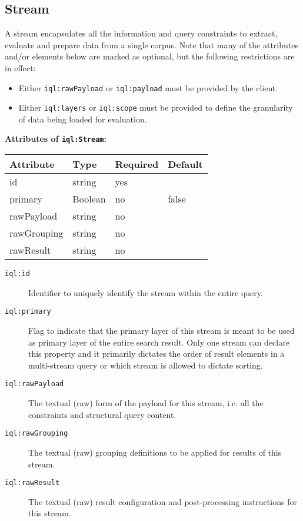 \documentclass[11pt]{article}
\newcommand{\compresslist}{ %
	\setlength{\topsep}{0pt}
	\setlength{\itemsep}{1pt}
	\setlength{\parskip}{0pt}
	\setlength{\parsep}{0pt}
}
\newcommand{\iqlns}{iql:}
\newcommand{\iqlType}[1]{\texttt{\iqlns#1}}
\newcommand{\desc}[1]{\noindent#1\newline\medskip}
\newenvironment{attributes}[1]{
\noindent\textbf{Attributes of #1:}\newline\medskip
\begin{tabular}{|p{0.3\textwidth}|p{0.20\textwidth}|p{0.20\textwidth}|p{0.17\textwidth}|}
	\hline
	\textbf{Attribute} & \textbf{Type} & \textbf{Required} & \textbf{Default} \\ 
	\hline
	\hline
}{
\end{tabular}
}
\newcommand{\attribute}[4]{
	#1 & #2 & #3 & #4 \\
	\hline
}
\begin{document}
\subsection{Stream}
\label{sec:json-ld-stream}
\desc{A stream encapsulates all the information and query constraints to extract, evaluate and prepare data from a single corpus. Note that many of the attributes and/or elements below are marked as optional, but the following restrictions are in effect:}
\vspace{-\medskipamount}
\begin{itemize}[leftmargin=*,topsep=0pt]\compresslist
	\item Either \iqlType{rawPayload} or \iqlType{payload} must be provided by the client.
	\item Either \iqlType{layers} or \iqlType{scope} must be provided to define the granularity of data being loaded for evaluation.
\end{itemize}
\begin{attributes}{\iqlType{Stream}}
	\attribute{id}{string}{yes}{}
	\attribute{primary}{Boolean}{no}{false}
	\attribute{rawPayload}{string}{no}{}
	\attribute{rawGrouping}{string}{no}{}
	\attribute{rawResult}{string}{no}{}
\end{attributes}
\begin{description}
	\item[\iqlType{id}] Identifier to uniquely identify the stream within the entire query.
	\item[\iqlType{primary}] Flag to indicate that the primary layer of this stream is meant to be used as primary layer of the entire search result. Only one stream can declare this property and it primarily dictates the order of result elements in a multi-stream query or which stream is allowed to dictate sorting.
	\item[\iqlType{rawPayload}] The textual (raw) form of the payload for this stream, i.e. all the constraints and structural query content.
	\item[\iqlType{rawGrouping}] The textual (raw) grouping definitions to be applied for results of this stream.
	\item[\iqlType{rawResult}] The textual (raw) result configuration and post-processing instructions for this stream.
\end{description}
\end{document}

